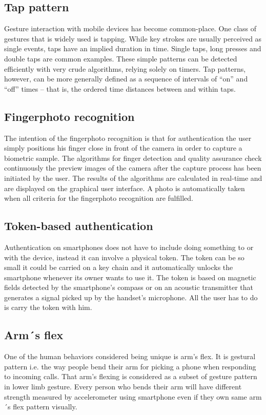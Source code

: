 \subsection{Tap pattern}
Gesture interaction with mobile devices has become common-place. One class of gestures that is widely used is tapping. While key strokes are usually perceived as single events, taps have an implied duration in time. Single taps, long presses and double taps are common examples. These simple patterns can be detected efficiently with very crude algorithms, relying solely on timers. Tap patterns, however, can be more generally defined as a sequence of intervals of “on” and “off” times – that is, the ordered time distances between and within taps. \cite{marques2013under}

\subsection{Fingerphoto recognition}
The intention of the fingerphoto recognition is that for authentication the user simply positions his finger close in front of the camera in order to capture a biometric sample. The algorithms for finger detection and quality assurance check continuously the preview images of the camera after the capture process has been initiated by the user. The results of the algorithms are calculated in real-time and are displayed on the graphical user interface. A photo is automatically taken when all criteria for the fingerphoto recognition are fulfilled. \cite{stein2012fingerphoto}

\subsection{Token-based authentication}
Authentication on smartphones does not have to include doing something to or with the device, instead it can involve a physical token. The token can be so small it could be carried on a key chain and it automatically unlocks the smartphone whenever its owner wants to use it. The token is based on magnetic fields detected by the smartphone’s compass or on an acoustic transmitter that generates a signal picked up by the handset’s microphone. All the user has to do is carry the token with him. \cite{bojinov2011mobile}

\subsection{Arm´s flex}
 One of the human behaviors considered being unique is arm’s flex. It is gestural pattern i.e. the way people bend their arm for picking a phone when responding to incoming calls. That arm’s flexing is considered as a subset of gesture pattern in lower limb gesture. Every person who bends their arm will have different strength measured by accelerometer using smartphone even if they own same arm´s flex pattern visually.\cite{negara2012arm}

